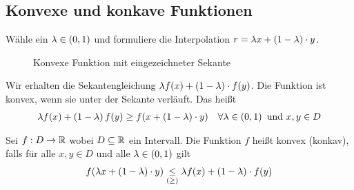 
\thispagestyle{pagenumberonly}

\subsection{Konvexe und konkave Funktionen}

\begin{skizze}
    \marginnote{[15. Feb]}
    Wähle ein $\lambda\in\left(0,1\right)$ und formuliere die Interpolation $r=\lambda x + \left(1-\lambda\right)\cdot y$.
    \begin{figure}[H]
        \centering
        \caption{Konvexe Funktion mit eingezeichneter Sekante}
    \end{figure}
    \noindent Wir erhalten die Sekantengleichung $\lambda f(x) +\left(1-\lambda\right)\cdot f(y)$. Die Funktion ist konvex, wenn sie unter der Sekante verläuft. Das heißt
    \begin{align*}
        \lambda f(x) +\pair{1-\lambda} f(y) \geq f\of{x+\pair{1-\lambda}\cdot y}\quad\forall\lambda\in\pair{0,1} \text{ und } x,y\in D
    \end{align*}
\end{skizze}

\begin{definition}
    Sei $f: D\rightarrow{} \mathbb{R}$ wobei $D\subseteq \mathbb{R}$ ein Intervall. Die Funktion $f$ heißt konvex (konkav), falls für alle $x,y\in D$ und alle $\lambda \in\left(0,1\right)$ gilt
    \begin{align*}
        f\of{\lambda x + \pair{1-\lambda}\cdot y} \underset{(\geq)}{\leq} \lambda f(x) + \pair{1-\lambda}\cdot f(y)
    \end{align*}
\end{definition}


